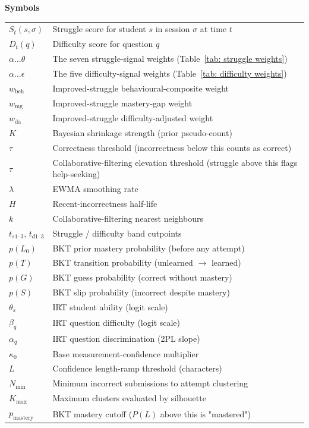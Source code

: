 \documentclass{article}
\numberwithin{figure}{section}
\numberwithin{table}{section}
\numberwithin{equation}{section}
\begin{document}
\newpage
\textbf{Symbols}\\
\begin{tabular}{@{}p{}p{}@{}}
$S_t(s,\sigma)$       & Struggle score for student $s$ in session $\sigma$ at time $t$ \\
$D_t(q)$              & Difficulty score for question $q$ \\
$\alpha\ldots\theta$  & The seven struggle-signal weights (Table~\ref{tab: struggle weights}) \\
$\alpha\ldots\epsilon$ & The five difficulty-signal weights (Table~\ref{tab: difficulty weights}) \\
$w_{\mathrm{beh}}$    & Improved-struggle behavioural-composite weight \\
$w_{\mathrm{mg}}$     & Improved-struggle mastery-gap weight \\
$w_{\mathrm{da}}$     & Improved-struggle difficulty-adjusted weight \\
$K$                   & Bayesian shrinkage strength (prior pseudo-count) \\
$\tau$                & Correctness threshold (incorrectness below this counts as correct) \\
$\tau$                & Collaborative-filtering elevation threshold (struggle above this flags help-seeking) \\
$\lambda$             & EWMA smoothing rate \\
$H$                   & Recent-incorrectness half-life \\
$k$                   & Collaborative-filtering nearest neighbours \\
$t_{s1\text{--}3},\, t_{d1\text{--}3}$ & Struggle / difficulty band cutpoints \\
$p(L_0)$   & BKT prior mastery probability (before any attempt) \\
$p(T)$     & BKT transition probability (unlearned $\to$ learned) \\
$p(G)$     & BKT guess probability (correct without mastery) \\
$p(S)$     & BKT slip probability (incorrect despite mastery) \\
$\theta_s$ & IRT student ability (logit scale) \\
$\beta_q$  & IRT question difficulty (logit scale) \\
$\alpha_q$ & IRT question discrimination (2PL slope) \\
$\kappa_0$ & Base measurement-confidence multiplier \\
$L$        & Confidence length-ramp threshold (characters) \\
$N_{\min}$ & Minimum incorrect submissions to attempt clustering \\
$K_{\max}$ & Maximum clusters evaluated by silhouette \\
$p_{\mathrm{mastery}}$ & BKT mastery cutoff ($P(L)$ above this is "mastered") \\
\end{tabular}
\end{document}
